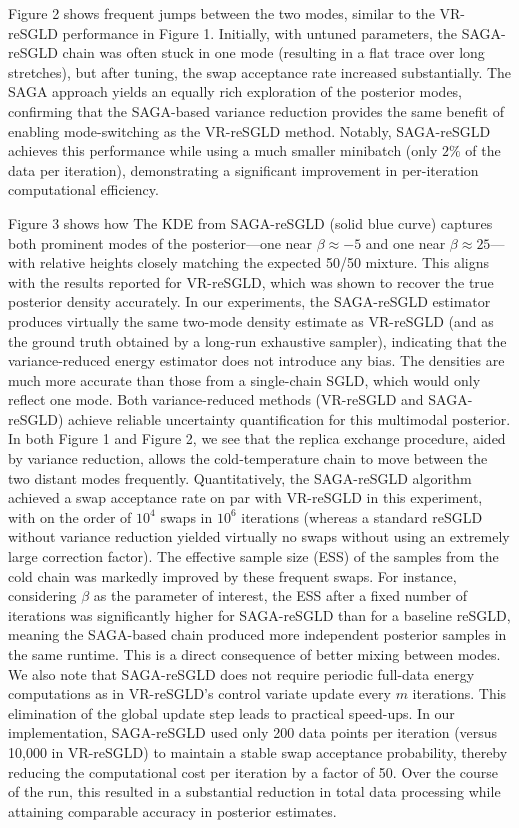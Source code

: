 \documentclass{article}
\begin{document}
Figure 2 shows frequent jumps between the two modes, similar to the VR-reSGLD performance in Figure 1. Initially, with untuned parameters, the SAGA-reSGLD chain was often stuck in one mode (resulting in a flat trace over long stretches), but after tuning, the swap acceptance rate increased substantially. The SAGA approach yields an equally rich exploration of the posterior modes, confirming that the SAGA-based variance reduction provides the same benefit of enabling mode-switching as the VR-reSGLD method. Notably, SAGA-reSGLD achieves this performance while using a much smaller minibatch (only $2\%$ of the data per iteration), demonstrating a significant improvement in per-iteration computational efficiency.

Figure 3 shows how The KDE from SAGA-reSGLD (solid blue curve) captures both prominent modes of the posterior—one near $\beta \approx -5$ and one near $\beta \approx 25$—with relative heights closely matching the expected 50/50 mixture. This aligns with the results reported for VR-reSGLD, which was shown to recover the true posterior density accurately. In our experiments, the SAGA-reSGLD estimator produces virtually the same two-mode density estimate as VR-reSGLD (and as the ground truth obtained by a long-run exhaustive sampler), indicating that the variance-reduced energy estimator does not introduce any bias. The densities are much more accurate than those from a single-chain SGLD, which would only reflect one mode. Both variance-reduced methods (VR-reSGLD and SAGA-reSGLD) achieve reliable uncertainty quantification for this multimodal posterior.
\newpage
In both Figure 1 and Figure 2, we see that the replica exchange procedure, aided by variance reduction, allows the cold-temperature chain to move between the two distant modes frequently. Quantitatively, the SAGA-reSGLD algorithm achieved a swap acceptance rate on par with VR-reSGLD in this experiment, with on the order of $10^4$ swaps in $10^6$ iterations (whereas a standard reSGLD without variance reduction yielded virtually no swaps without using an extremely large correction factor). The effective sample size (ESS) of the samples from the cold chain was markedly improved by these frequent swaps. For instance, considering $\beta$ as the parameter of interest, the ESS after a fixed number of iterations was significantly higher for SAGA-reSGLD than for a baseline reSGLD, meaning the SAGA-based chain produced more independent posterior samples in the same runtime. This is a direct consequence of better mixing between modes. We also note that SAGA-reSGLD does not require periodic full-data energy computations as in VR-reSGLD’s control variate update every $m$ iterations. This elimination of the global update step leads to practical speed-ups. In our implementation, SAGA-reSGLD used only 200 data points per iteration (versus 10,000 in VR-reSGLD) to maintain a stable swap acceptance probability, thereby reducing the computational cost per iteration by a factor of 50. Over the course of the run, this resulted in a substantial reduction in total data processing while attaining comparable accuracy in posterior estimates.
\end{document}

